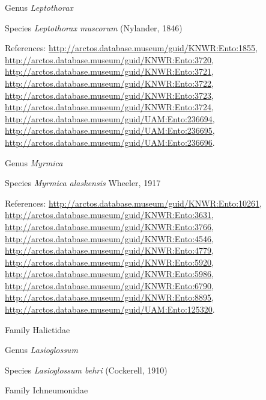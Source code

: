 \documentclass[9pt, article]{memoir}
\begin{document}
\begin{multicols}{2}
\vspace{6pt}\noindent\hspace{30pt}Genus \textit{Leptothorax}


\vspace{6pt}\noindent\hspace{36pt}Species \textit{Leptothorax muscorum} (Nylander, 1846)


References: 
\url{http://arctos.database.museum/guid/KNWR:Ento:1855}, 
\url{http://arctos.database.museum/guid/KNWR:Ento:3720}, 
\url{http://arctos.database.museum/guid/KNWR:Ento:3721}, 
\url{http://arctos.database.museum/guid/KNWR:Ento:3722}, 
\url{http://arctos.database.museum/guid/KNWR:Ento:3723}, 
\url{http://arctos.database.museum/guid/KNWR:Ento:3724}, 
\url{http://arctos.database.museum/guid/UAM:Ento:236694}, 
\url{http://arctos.database.museum/guid/UAM:Ento:236695}, 
\url{http://arctos.database.museum/guid/UAM:Ento:236696}.

\vspace{6pt}\noindent\hspace{30pt}Genus \textit{Myrmica}


\vspace{6pt}\noindent\hspace{36pt}Species \textit{Myrmica alaskensis} Wheeler, 1917


References: 
\url{http://arctos.database.museum/guid/KNWR:Ento:10261}, 
\url{http://arctos.database.museum/guid/KNWR:Ento:3631}, 
\url{http://arctos.database.museum/guid/KNWR:Ento:3766}, 
\url{http://arctos.database.museum/guid/KNWR:Ento:4546}, 
\url{http://arctos.database.museum/guid/KNWR:Ento:4779}, 
\url{http://arctos.database.museum/guid/KNWR:Ento:5920}, 
\url{http://arctos.database.museum/guid/KNWR:Ento:5986}, 
\url{http://arctos.database.museum/guid/KNWR:Ento:6790}, 
\url{http://arctos.database.museum/guid/KNWR:Ento:8895}, 
\url{http://arctos.database.museum/guid/UAM:Ento:125320}.

\vspace{6pt}\noindent\hspace{24pt}Family Halictidae


\vspace{6pt}\noindent\hspace{30pt}Genus \textit{Lasioglossum}


\vspace{6pt}\noindent\hspace{36pt}Species \textit{Lasioglossum behri} (Cockerell, 1910)


\vspace{6pt}\noindent\hspace{24pt}Family Ichneumonidae



\end{multicols}
\end{document}
